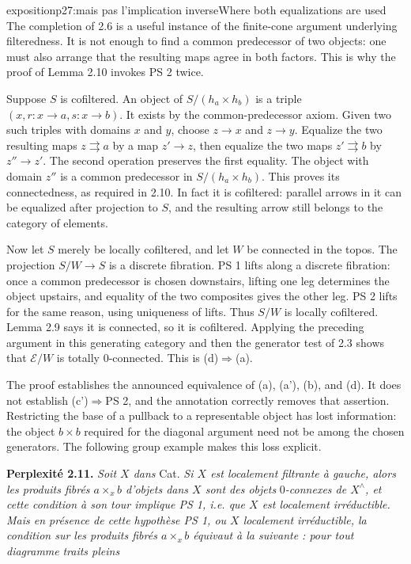 \begin{dcomment}{exposition}{p27:mais pas l'implication inverse}{Where both equalizations are used}
The completion of 2.6 is a useful instance of the finite-cone argument underlying filteredness. It is not enough to find a common predecessor of two objects: one must also arrange that the resulting maps agree in both factors. This is why the proof of Lemma 2.10 invokes PS 2 twice.

Suppose $S$ is cofiltered. An object of $S/(h_a\times h_b)$ is a triple $(x,r:x\to a,s:x\to b)$. It exists by the common-predecessor axiom. Given two such triples with domains $x$ and $y$, choose $z\to x$ and $z\to y$. Equalize the two resulting maps $z\rightrightarrows a$ by a map $z'\to z$, then equalize the two maps $z'\rightrightarrows b$ by $z''\to z'$. The second operation preserves the first equality. The object with domain $z''$ is a common predecessor in $S/(h_a\times h_b)$. This proves its connectedness, as required in 2.10. In fact it is cofiltered: parallel arrows in it can be equalized after projection to $S$, and the resulting arrow still belongs to the category of elements.

Now let $S$ merely be locally cofiltered, and let $W$ be connected in the topos. The projection $S/W\to S$ is a discrete fibration. PS 1 lifts along a discrete fibration: once a common predecessor is chosen downstairs, lifting one leg determines the object upstairs, and equality of the two composites gives the other leg. PS 2 lifts for the same reason, using uniqueness of lifts. Thus $S/W$ is locally cofiltered. Lemma 2.9 says it is connected, so it is cofiltered. Applying the preceding argument in this generating category and then the generator test of 2.3 shows that $\mathcal E/W$ is totally $0$-connected. This is (d)$\Rightarrow$(a).

The proof establishes the announced equivalence of (a), (a'), (b), and (d). It does not establish (c')$\Rightarrow$PS 2, and the annotation correctly removes that assertion. Restricting the base of a pullback to a representable object has lost information: the object $b\times b$ required for the diagonal argument need not be among the chosen generators. The following group example makes this loss explicit.
\end{dcomment}


\textbf{Perplexité 2.11.} \textit{Soit $X$ dans} Cat. \textit{Si $X$ est localement filtrante à gauche, alors les produits fibrés $a\times_x b$ d'objets dans $X$ sont des objets} $0$\textit{-connexes de $X^\wedge$, et cette condition à son tour implique PS 1, i.e. que $X$ est localement irréductible. Mais en présence de cette hypothèse PS 1, ou $X$ localement irréductible, la condition sur les produits fibrés $a\times_x b$ équivaut à la suivante : pour tout diagramme} \textit{traits pleins}

